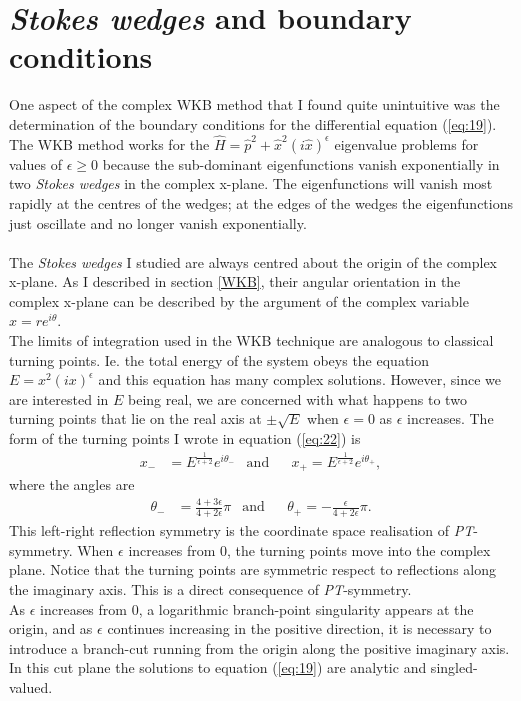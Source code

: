 \documentclass[10pt, a4paper, singlespacing, headsepline]{report}
\newcommand\PT{\emph{PT}}
\begin{document}
\section{\emph{Stokes wedges} and boundary conditions} \label{Boundary conditions}

One aspect of the complex WKB method that I found quite unintuitive was the determination of the boundary conditions for the differential equation (\ref{eq:19}).\\
The WKB method works for the $\hat{H} = \hat{p}^2 + \hat{x}^2 (i \hat{x})^{\epsilon}$ eigenvalue problems for values of $\epsilon \geq 0$ because the sub-dominant eigenfunctions vanish exponentially in two \emph{Stokes wedges} in the complex x-plane. The eigenfunctions will vanish most rapidly at the centres of the wedges; at the edges of the wedges the eigenfunctions just oscillate and no longer vanish exponentially\cite{BenderPT}.\\\\
The \emph{Stokes wedges} I studied are always centred about the origin of the complex x-plane. As I described in section \ref{WKB}, their angular orientation in the complex x-plane can be described by the argument of the complex variable $x = re^{i\theta}$.\\
The limits of integration used in the WKB technique are analogous to classical turning points. Ie. the total energy of the system obeys the equation $E = x^2 (ix)^{\epsilon}$ and this equation has many complex solutions. However, since we are interested in $E$ being real, we are concerned with what happens to two turning points that lie on the real axis at $\pm \sqrt{E}$ when $\epsilon = 0$ as $\epsilon$ increases\cite{BenderPT}.
The form of the turning points I wrote in equation (\ref{eq:22}) is 
\begin{align} \label{eq:32}
x_{-}& = 
E^{\frac{1}{\epsilon + 2}}
e^{i\theta_{-}}
&\mathrm{and}&
&x_{+} = E^{\frac{1}{\epsilon + 2}} e^{i\theta_{+}},
\end{align}
where the angles are
\begin{align} \label{eq:33}
\theta_{-}& = \frac{4 + 3\epsilon}{4 + 2 \epsilon} \pi
&\mathrm{and}&
&\theta_{+} = - \frac{\epsilon}{4 + 2 \epsilon} \pi.
\end{align}
This left-right reflection symmetry is the coordinate space realisation of \PT-symmetry\cite{BenderPT}.
When $\epsilon$ increases from 0, the turning points move into the complex plane. Notice that the turning points are symmetric respect to reflections along the imaginary axis. This is a direct consequence of \PT-symmetry\cite{BenderPT}.\\
As $\epsilon$ increases from 0, a logarithmic branch-point singularity appears at the origin, and as $\epsilon$ continues increasing in the positive direction, it is necessary to introduce a branch-cut running from the origin along the positive imaginary axis. In this cut plane the solutions to equation (\ref{eq:19}) are analytic and singled-valued\cite{BenderPT}.\\
\end{document}
